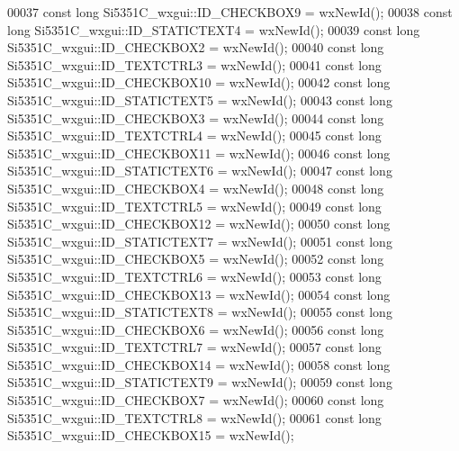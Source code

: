 \begin{DoxyCode}
00037 \textcolor{keyword}{const} \textcolor{keywordtype}{long} Si5351C_wxgui::ID_CHECKBOX9 = wxNewId();
00038 \textcolor{keyword}{const} \textcolor{keywordtype}{long} Si5351C_wxgui::ID_STATICTEXT4 = wxNewId();
00039 \textcolor{keyword}{const} \textcolor{keywordtype}{long} Si5351C_wxgui::ID_CHECKBOX2 = wxNewId();
00040 \textcolor{keyword}{const} \textcolor{keywordtype}{long} Si5351C_wxgui::ID_TEXTCTRL3 = wxNewId();
00041 \textcolor{keyword}{const} \textcolor{keywordtype}{long} Si5351C_wxgui::ID_CHECKBOX10 = wxNewId();
00042 \textcolor{keyword}{const} \textcolor{keywordtype}{long} Si5351C_wxgui::ID_STATICTEXT5 = wxNewId();
00043 \textcolor{keyword}{const} \textcolor{keywordtype}{long} Si5351C_wxgui::ID_CHECKBOX3 = wxNewId();
00044 \textcolor{keyword}{const} \textcolor{keywordtype}{long} Si5351C_wxgui::ID_TEXTCTRL4 = wxNewId();
00045 \textcolor{keyword}{const} \textcolor{keywordtype}{long} Si5351C_wxgui::ID_CHECKBOX11 = wxNewId();
00046 \textcolor{keyword}{const} \textcolor{keywordtype}{long} Si5351C_wxgui::ID_STATICTEXT6 = wxNewId();
00047 \textcolor{keyword}{const} \textcolor{keywordtype}{long} Si5351C_wxgui::ID_CHECKBOX4 = wxNewId();
00048 \textcolor{keyword}{const} \textcolor{keywordtype}{long} Si5351C_wxgui::ID_TEXTCTRL5 = wxNewId();
00049 \textcolor{keyword}{const} \textcolor{keywordtype}{long} Si5351C_wxgui::ID_CHECKBOX12 = wxNewId();
00050 \textcolor{keyword}{const} \textcolor{keywordtype}{long} Si5351C_wxgui::ID_STATICTEXT7 = wxNewId();
00051 \textcolor{keyword}{const} \textcolor{keywordtype}{long} Si5351C_wxgui::ID_CHECKBOX5 = wxNewId();
00052 \textcolor{keyword}{const} \textcolor{keywordtype}{long} Si5351C_wxgui::ID_TEXTCTRL6 = wxNewId();
00053 \textcolor{keyword}{const} \textcolor{keywordtype}{long} Si5351C_wxgui::ID_CHECKBOX13 = wxNewId();
00054 \textcolor{keyword}{const} \textcolor{keywordtype}{long} Si5351C_wxgui::ID_STATICTEXT8 = wxNewId();
00055 \textcolor{keyword}{const} \textcolor{keywordtype}{long} Si5351C_wxgui::ID_CHECKBOX6 = wxNewId();
00056 \textcolor{keyword}{const} \textcolor{keywordtype}{long} Si5351C_wxgui::ID_TEXTCTRL7 = wxNewId();
00057 \textcolor{keyword}{const} \textcolor{keywordtype}{long} Si5351C_wxgui::ID_CHECKBOX14 = wxNewId();
00058 \textcolor{keyword}{const} \textcolor{keywordtype}{long} Si5351C_wxgui::ID_STATICTEXT9 = wxNewId();
00059 \textcolor{keyword}{const} \textcolor{keywordtype}{long} Si5351C_wxgui::ID_CHECKBOX7 = wxNewId();
00060 \textcolor{keyword}{const} \textcolor{keywordtype}{long} Si5351C_wxgui::ID_TEXTCTRL8 = wxNewId();
00061 \textcolor{keyword}{const} \textcolor{keywordtype}{long} Si5351C_wxgui::ID_CHECKBOX15 = wxNewId();

\end{DoxyCode}
